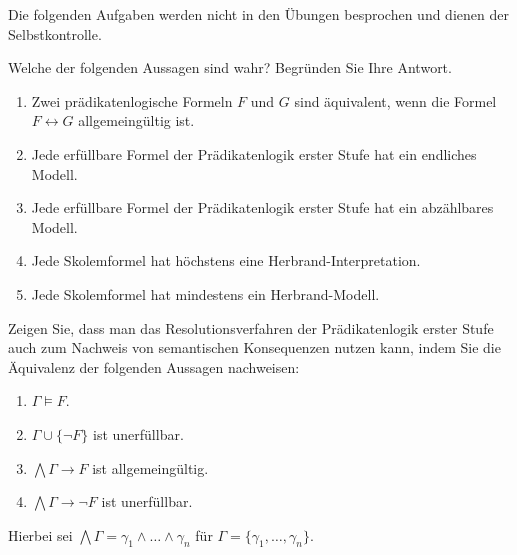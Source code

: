\documentclass[german]{latteachCD}[2017/03/28]
\begin{document}
\maketitle

\begin{mdframed}
  Die folgenden Aufgaben werden nicht in den Übungen besprochen und dienen der
  Selbstkontrolle.

  \renewcommand{\theexercise}{\Roman{exercise}}
  \setcounter{exercise}{5}

  \begin{exercise}
    Welche der folgenden Aussagen sind wahr?  Begründen Sie Ihre Antwort.
    \begin{enumerate}
    \item Zwei prädikatenlogische Formeln $F$ und $G$ sind äquivalent, wenn die
      Formel $F \leftrightarrow G$ allgemeingültig ist.
    \item Jede erfüllbare Formel der Prädikatenlogik erster Stufe hat ein
      endliches Modell.
    \item Jede erfüllbare Formel der Prädikatenlogik erster Stufe hat ein
      abzählbares Modell.
    \item Jede Skolemformel hat höchstens eine Herbrand-Interpretation.
    \item Jede Skolemformel hat mindestens ein Herbrand-Modell.
    \end{enumerate}
  \end{exercise}

  \begin{exercise}
    Zeigen Sie, dass man das Resolutionsverfahren der Prädikatenlogik erster Stufe
    auch zum Nachweis von semantischen Konsequenzen nutzen kann, indem Sie die
    Äquivalenz der folgenden Aussagen nachweisen:
    \begin{enumerate}
    \item $\Gamma \models F$.
    \item $\Gamma \cup \{\neg F\}$ ist unerfüllbar.
    \item $\bigwedge \Gamma \to F$ ist allgemeingültig.
    \item $\bigwedge \Gamma \to \neg F$ ist unerfüllbar.
    \end{enumerate}
    Hierbei sei $\bigwedge \Gamma = \gamma_{1} \land \dots \land \gamma_{n}$ für
    $\Gamma = \{\gamma_{1},\ldots,\gamma_{n}\}$.
  \end{exercise}
\end{mdframed}
\end{document}
